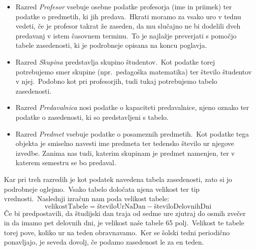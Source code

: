 \documentclass[a4paper]{article}
\begin{document}

\begin{itemize}
	\item Razred \emph{Profesor} vsebuje osebne podatke profesorja (ime in priimek) ter
   podatke o predmetih, ki jih predava.\ Hkrati moramo za vsako uro v tednu vedeti, če
   je profesor takrat že zaseden, da mu slučajno ne bi dodelili dveh predavanj v istem
   časovnem terminu.\ To je najlažje preverjati s pomočjo tabele zasedenosti, ki je
   podrobneje opisana na koncu poglavja.

   \item Razred \emph{Skupina} predstavlja skupino študentov.\ Kot podatke torej potrebujemo
   smer skupine (npr.\ pedagoška matematika) ter število študentov v njej.\ Podobno kot pri
   profesorjih, tudi tukaj potrebujemo tabelo zasedenosti.

   \item Razred \emph{Predavalnica} nosi podatke o kapaciteti predavalnice, njeno oznako
   ter podatke o zasedenosti, ki so predstavljeni s tabelo.

   \item Razred \emph{Predmet} vsebuje podatke o posameznih predmetih.\ Kot podatke tega
   objekta je smiselno navesti ime predmeta ter tedensko število ur njegove izvedbe.
   Zanima nas tudi, katerim skupinam je predmet namenjen, ter v katerem semestru se bo
   predaval.

\end{itemize}
\noindent Kar pri treh razredih je kot podatek navedena tabela zasedenosti, zato si jo podrobneje
oglejmo.\ Vsako tabelo določata njena velikost ter tip vrednosti.\ Naslednji izračun nam
poda velikost tabele:
$$\mathrm{velikostTabele = številoUrNaDan - številoDelovnihDni} $$
Če bi predpostavili, da študijski dan traja od sedme ure zjutraj do osmih zvečer in da
imamo pet delovnih dni, je velikost naše tabele 65 polj.\ Velikost te tabele torej pove,
koliko ur na teden obravnavamo.\ Ker se šolski tedni periodično ponavljajo, je seveda
dovolj, če podamo zasedenost le za en teden.
\end{document}
